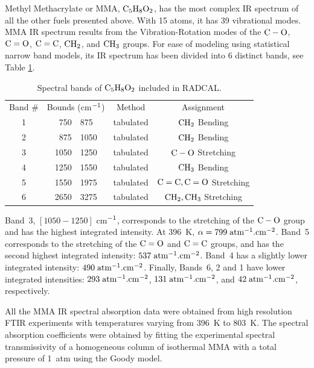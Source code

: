   Methyl Methacrylate or MMA, $\rm C_5H_8O_2$, 
  has the most complex IR spectrum of all the other 
  fuels presented above. With 15 atoms, it has 39 vibrational modes.
  MMA IR spectrum results from the Vibration-Rotation
  modes of the $\rm C-O$, $\rm C=O$, $\rm C=C$, $\rm CH_2$, and $\rm CH_3$ groups.
  For ease of modeling using statistical narrow band models, its IR spectrum has
  been divided into 6 distinct bands, see Table \ref{Table::C5H8O2}.
  \begin{table}[ht] 
   \centering
   \caption{Spectral bands of $\rm C_5H_8O_2$ included in RADCAL.}
   \vspace{0.1in}
   \label{Table::C5H8O2}
    \begin{tabular}{|c|r@{-}l|c|c|} 
    \hline
    Band \# & \multicolumn{2}{|l|}{Bounds (cm$\rm ^{-1}$) } & Method & Assignment \\
    \cline{1-5}  
    1 & 750  & 875  & tabulated & $\rm CH_2$ Bending \\
    2 & 875  & 1050 & tabulated & $\rm CH_2$ Bending \\
    3 & 1050 & 1250 & tabulated & $\rm C-O$ Stretching \\ 
    4 & 1250 & 1550 & tabulated & $\rm CH_3$ Bending \\     
    5 & 1550 & 1975 & tabulated & $\rm C=C, C=O$ Stretching \\
    6 & 2650 & 3275 & tabulated & $\rm CH_2, CH_3$ Stretching \\
    \hline
   \end{tabular} 
  \end{table} 
  Band~3, $\left[1050-1250\right]$ cm$\rm ^{-1}$, corresponds to the 
  stretching of the $\rm C-O$ group and has the highest integrated intensity.
  At 396~K, $\alpha = 799\;\rm {atm^{-1}.cm^{-2}}$.
  Band~5 corresponds to the stretching of the $\rm C=O$ and $\rm C=C$ groups,
  and has the second highest integrated intensity: $537\;\rm {atm^{-1}.cm^{-2}}$.
  Band~4 has a slightly lower integrated intensity: $490\;\rm {atm^{-1}.cm^{-2}}$.
  Finally, Bands~6, 2 and 1 have lower integrated intensities: $293\;\rm {atm^{-1}.cm^{-2}}$,
  $131\;\rm {atm^{-1}.cm^{-2}}$, and $42\;\rm {atm^{-1}.cm^{-2}}$, respectively.  

  All the MMA IR spectral absorption data were obtained from high resolution
  FTIR experiments with temperatures varying from 396~K to 803~K.
  The spectral absorption coefficients were obtained by fitting the experimental
  spectral transmissivity of a homogeneous column of isothermal MMA
  with a total pressure of 1~atm using the Goody model.

